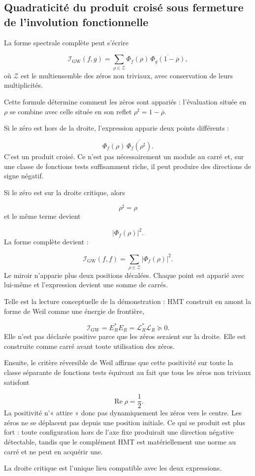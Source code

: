 \subsection{Quadraticité du produit croisé sous fermeture de l’involution fonctionnelle}
La forme spectrale complète peut s’écrire\par
\[
\mathscr I_{\mathrm{GW}}(f,g)
=
\sum_{\rho\in\mathscr Z}
\Phi_f(\rho)\,
\overline{\Phi_g(1-\overline\rho)},
\]
où \(\mathscr Z\) est le multiensemble des zéros non triviaux, avec conservation de leurs multiplicités.\par
Cette formule détermine comment les zéros sont appariés : l’évaluation située en \(\rho\) se combine avec celle située en son reflet \(\rho^\sharp=1-\overline\rho\).\par
Si le zéro est hors de la droite, l’expression apparie deux points différents :\par
\[
\Phi_f(\rho)\,
\overline{\Phi_f(\rho^\sharp)}.
\]
C’est un produit croisé. Ce n’est pas nécessairement un module au carré et, sur une classe de fonctions tests suffisamment riche, il peut produire des directions de signe négatif.\par
Si le zéro est sur la droite critique, alors\par
\[
\rho^\sharp=\rho
\]
et le même terme devient\par
\[
|\Phi_f(\rho)|^2.
\]
La forme complète devient :\par
\[
\mathscr I_{\mathrm{GW}}(f,f)
=
\sum_{\rho\in\mathscr Z}
|\Phi_f(\rho)|^2.
\]
Le miroir n’apparie plus deux positions décalées. Chaque point est apparié avec lui-même et l’expression devient une somme de carrés.\par
Telle est la lecture conceptuelle de la démonstration : HMT construit en amont la forme de Weil comme une énergie de frontière,\par
\[
\mathscr I_{\mathrm{GW}}
=
E_R^*E_R
=
\mathscr L_R^*\mathscr L_R
\succeq0.
\]
Elle n’est pas déclarée positive parce que les zéros seraient sur la droite. Elle est construite comme carré avant toute utilisation des zéros.\par
Ensuite, le critère réversible de Weil affirme que cette positivité sur toute la classe séparante de fonctions tests équivaut au fait que tous les zéros non triviaux satisfont\par
\[
\operatorname{Re}\rho=\frac12.
\]
La positivité n’« attire » donc pas dynamiquement les zéros vers le centre. Les zéros ne se déplacent pas depuis une position initiale. Ce qui se produit est plus fort : toute configuration hors de l’axe fixe produirait une direction négative détectable, tandis que le complément HMT est matériellement une norme au carré et ne peut en acquérir une.\par
La droite critique est l’unique lieu compatible avec les deux expressions.\par
{}

